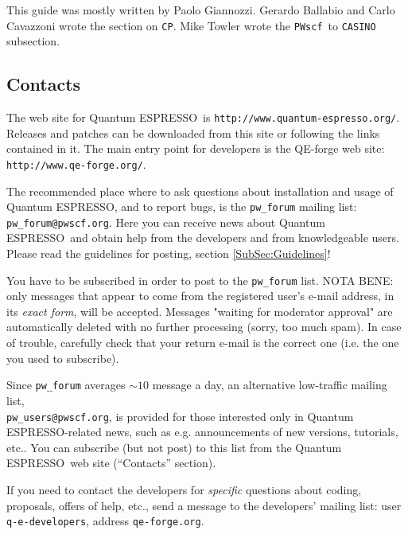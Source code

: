 \documentclass[12pt,a4paper]{article}
\def\qe{{\sc Quantum ESPRESSO}}
\def\PWscf{\texttt{PWscf}}
\def\CP{\texttt{CP}}
\begin{document}
This guide was mostly written by Paolo Giannozzi.
Gerardo Ballabio and Carlo Cavazzoni wrote the section on \CP. Mike Towler
wrote the \PWscf\ to \texttt{CASINO} subsection.

\subsection{Contacts}
\label{SubSec:Contacts}

The web site for \qe\ is \texttt{http://www.quantum-espresso.org/}.
Releases and patches can be downloaded from this
site or following the links contained in it. The main entry point for 
developers is the QE-forge web site:
\texttt{http://www.qe-forge.org/}.

The recommended place where to ask questions about installation 
and usage of \qe, and to report bugs, is the \texttt{pw\_forum} 
mailing list: \texttt{pw\_forum@pwscf.org}. Here you can receive
news about \qe\ and obtain help from the developers and from 
knowledgeable users. Please read the guidelines for posting,
section \ref{SubSec:Guidelines}!

You have to be subscribed in order to post to the  \texttt{pw\_forum}
list. NOTA BENE: only messages that appear to come from the 
registered user's e-mail address, in its {\em exact form}, will be
accepted. Messages "waiting for moderator approval" are
automatically deleted with no further processing (sorry, too 
much spam). In case of trouble, carefully check that your return 
e-mail is the correct one (i.e. the one you used to subscribe).

Since \texttt{pw\_forum} averages $\sim 10$ message a day, an alternative
low-traffic mailing list,\\
\texttt{pw\_users@pwscf.org}, is provided for
those interested only in \qe-related news, such as e.g. announcements 
of new versions, tutorials, etc.. You can subscribe (but not post) to 
this list from the \qe\ web site (``Contacts'' section).

If you need to contact the developers for {\em specific} questions 
about coding, proposals, offers of help, etc., send a message to the
developers' mailing list: user \texttt{q-e-developers}, address
\texttt{qe-forge.org}.
\end{document}
